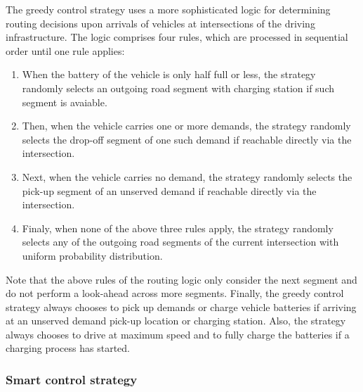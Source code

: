 \documentclass[a4paper,twoside]{article}
\begin{document}
	The greedy control strategy uses a more sophisticated logic for determining routing decisions upon arrivals of vehicles at intersections of the driving infrastructure.
	The logic comprises four rules, which are processed in sequential order until one rule applies:
	\begin{enumerate}
		\item When the battery of the vehicle is only half full or less, the strategy randomly selects an outgoing road segment with charging station if such segment is avaiable.
		\item Then, when the vehicle carries one or more demands, the strategy randomly selects the drop-off segment of one such demand if reachable directly via the intersection.
		\item Next, when the vehicle carries no demand, the strategy randomly selects the pick-up segment of an unserved demand if reachable directly via the intersection.
		\item Finaly, when none of the above three rules apply, the strategy randomly selects any of the outgoing road segments of the current intersection with uniform probability distribution.
	\end{enumerate}
	Note that the above rules of the routing logic only consider the next segment and do not perform a look-ahead across more segments.
	Finally, the greedy control strategy always chooses to pick up demands or charge vehicle batteries if arriving at an unserved demand pick-up location or charging station.
	Also, the strategy always chooses to drive at maximum speed and to fully charge the batteries if a charging process has started.
	
	\subsubsection*{Smart control strategy}
	\label{sec:controller-smart}
	
\end{document}
